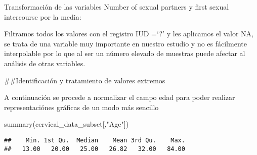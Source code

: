 \documentclass[
]{article}
\newenvironment{Shaded}{\begin{snugshade}}{\end{snugshade}}
\newcommand{\AttributeTok}[1]{\textcolor[rgb]{0.80,0.80,0.80}{#1}}
\newcommand{\FunctionTok}[1]{\textcolor[rgb]{0.94,0.94,0.56}{#1}}
\newcommand{\NormalTok}[1]{\textcolor[rgb]{0.80,0.80,0.80}{#1}}
\newcommand{\OtherTok}[1]{\textcolor[rgb]{0.94,0.94,0.56}{#1}}
\newcommand{\SpecialCharTok}[1]{\textcolor[rgb]{0.86,0.64,0.64}{#1}}
\newcommand{\StringTok}[1]{\textcolor[rgb]{0.80,0.58,0.58}{#1}}
\begin{document}
Transformación de las variables Number of sexual partners y first sexual
intercourse por la media:

\begin{Shaded}
\end{Shaded}

Filtramos todos los valores con el registro IUD =`?' y les aplicamos el
valor NA, se trata de una variable muy importante en nuestro estudio y
no es fácilmente interpolable por lo que al ser un número elevado de
muestras puede afectar al análisis de otras variables.

\begin{Shaded}
\end{Shaded}

\#\#Identificación y tratamiento de valores extremos

A continuación se procede a normalizar el campo edad para poder realizar
representaciónes gráficas de un modo más sencillo

\begin{Shaded}
\begin{Highlighting}[]
\FunctionTok{summary}\NormalTok{(cervical\_data\_subset[,}\StringTok{"Age"}\NormalTok{])}
\end{Highlighting}
\end{Shaded}

\begin{verbatim}
##    Min. 1st Qu.  Median    Mean 3rd Qu.    Max. 
##   13.00   20.00   25.00   26.82   32.00   84.00
\end{verbatim}
\end{document}
